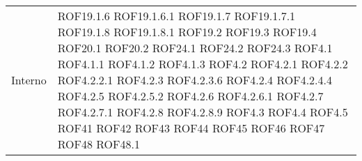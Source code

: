 \begin{longtable}{p{2.5cm}!{\VRule[1pt]}p{2.5cm}}
	Interno & ROF19.1.6 \newline ROF19.1.6.1 \newline ROF19.1.7 \newline ROF19.1.7.1 \newline ROF19.1.8 \newline ROF19.1.8.1 \newline ROF19.2 \newline ROF19.3 \newline ROF19.4 \newline ROF20.1 \newline ROF20.2 \newline ROF24.1 \newline ROF24.2 \newline ROF24.3 \newline ROF4.1 \newline ROF4.1.1 \newline ROF4.1.2 \newline ROF4.1.3 \newline ROF4.2 \newline ROF4.2.1 \newline ROF4.2.2 \newline ROF4.2.2.1 \newline ROF4.2.3 \newline ROF4.2.3.6 \newline ROF4.2.4 \newline ROF4.2.4.4 \newline ROF4.2.5 \newline ROF4.2.5.2 \newline ROF4.2.6 \newline ROF4.2.6.1 \newline ROF4.2.7 \newline ROF4.2.7.1 \newline ROF4.2.8 \newline ROF4.2.8.9 \newline ROF4.3 \newline ROF4.4 \newline ROF4.5 \newline ROF41 \newline ROF42 \newline ROF43 \newline ROF44 \newline ROF45 \newline ROF46 \newline ROF47 \newline ROF48 \newline ROF48.1 \\

\end{longtable}
